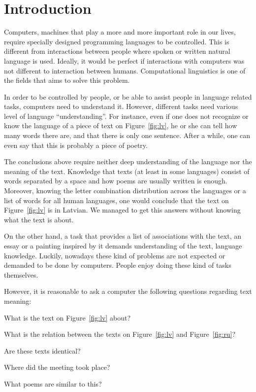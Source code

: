 \chapter{Introduction}
\label{ch:introduction}

Computers, machines that play a more and more important role in our lives,
require specially designed programming languages to be controlled. This is
different from interactions between people where spoken or written natural
language is used. Ideally, it would be perfect if interactions with computers
was not different to interaction between humans. Computational linguistics is
one of the fields that aims to solve this problem.

In order to be controlled by people, or be able to assist people in language
related tasks, computers need to understand it. However, different tasks need
various level of language ``understanding''. For instance, even if one does not
recognize or know the language of a piece of text on Figure~\ref{fig:lv}, he or
she can tell how many words there are, and that there is only one
sentence. After a while, one can even say that this is probably a piece of
poetry.

The conclusions above require neither deep understanding of the language nor the
meaning of the text. Knowledge that texts (at least in some languages) consist
of words separated by a space and how poems are usually written is
enough. Moreover, knowing the letter combination distribution across the
languages or a list of words for all human languages, one would conclude that
the text on Figure~\ref{fig:lv} is in Latvian. We managed to get this answers
without knowing what the text is about.



On the other hand, a task that provides a list of associations with the text, an
essay or a painting inspired by it demands understanding of the text, language
knowledge. Luckily, nowadays these kind of problems are not expected or demanded
to be done by computers. People enjoy doing these kind of tasks themselves.

However, it is reasonable to ask a computer the following questions regarding
text meaning:
\begin{inparaenum}[a)]
\item What is the text on Figure~\ref{fig:lv} about?
\item What is the relation between the texts on Figure~\ref{fig:lv} and
  Figure~\ref{fig:ru}?
\item Are these texts identical?
\item Where did the meeting took place?
\item What poems are similar to this?
\end{inparaenum}

